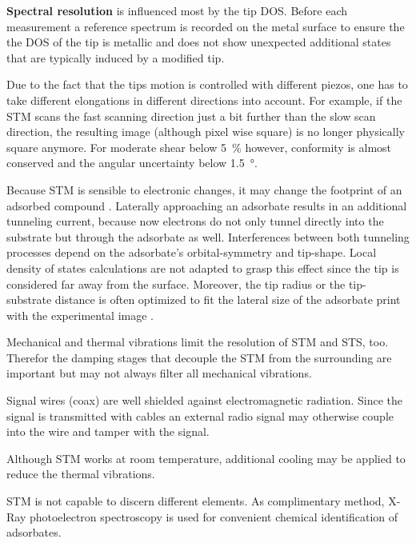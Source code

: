 \textbf{Spectral resolution} is influenced most by the tip DOS. Before each measurement a reference spectrum is recorded on the metal surface to ensure the the DOS of the tip is metallic and does not show unexpected additional states that are typically induced by a modified tip.

Due to the fact that the tips motion is controlled with different piezos, one has to take different elongations in different directions into account. For example, if the STM scans the fast scanning direction just a bit further than the slow scan direction, the resulting image (although pixel wise square) is no longer physically square anymore. 
For moderate shear below \SI{5}{\percent} however, conformity is almost conserved and the angular uncertainty below \SI{1.5}{\degree}.

Because STM is sensible to electronic changes, it may change the footprint of an adsorbed compound \cite{sautet_interpretation_1992}. Laterally approaching an adsorbate results in an additional tunneling current, because now electrons do not only tunnel directly into the substrate but through the adsorbate as well. Interferences between both tunneling processes depend on the adsorbate's orbital-symmetry and tip-shape. Local density of states calculations \cite{tersoff_theory_1985, lang_theory_1986, eigler_imaging_1991} are not adapted to grasp this effect since the tip is considered far away from the surface. Moreover, the tip radius or the tip-substrate distance is often optimized to fit the lateral size of the adsorbate print with the experimental image \cite{tersoff_theory_1985, eigler_imaging_1991}. 


Mechanical and thermal vibrations limit the resolution of STM and STS, too. Therefor the damping stages that decouple the STM from the surrounding are important but may not always filter all mechanical vibrations. 

Signal wires (coax) are well shielded against electromagnetic radiation. Since the signal is transmitted with cables an external radio signal may otherwise couple into the wire and tamper with the signal.

Although STM works at room temperature, additional cooling may be applied to reduce the thermal vibrations.

STM is not capable to discern different elements. As complimentary method, X-Ray photoelectron spectroscopy is used for convenient chemical identification of adsorbates.